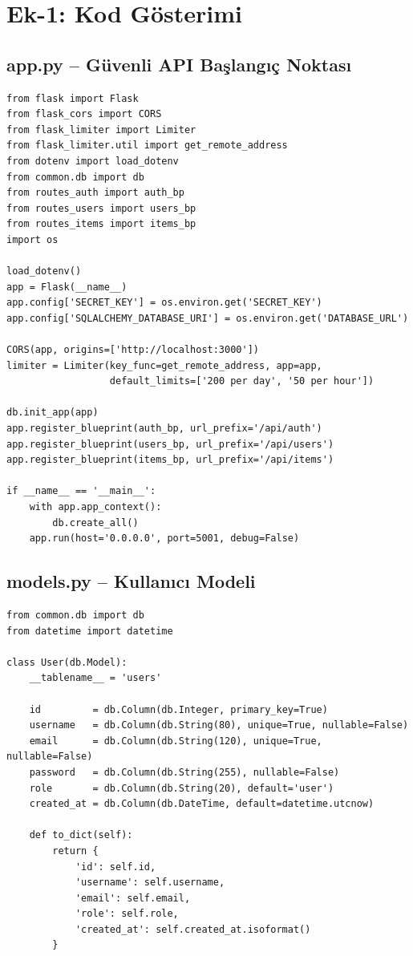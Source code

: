 \section{Ek-1: Kod Gösterimi}
\label{ek1}

\subsection{app.py -- Güvenli API Başlangıç Noktası}

\begin{lstlisting}
from flask import Flask
from flask_cors import CORS
from flask_limiter import Limiter
from flask_limiter.util import get_remote_address
from dotenv import load_dotenv
from common.db import db
from routes_auth import auth_bp
from routes_users import users_bp
from routes_items import items_bp
import os

load_dotenv()
app = Flask(__name__)
app.config['SECRET_KEY'] = os.environ.get('SECRET_KEY')
app.config['SQLALCHEMY_DATABASE_URI'] = os.environ.get('DATABASE_URL')

CORS(app, origins=['http://localhost:3000'])
limiter = Limiter(key_func=get_remote_address, app=app,
                  default_limits=['200 per day', '50 per hour'])

db.init_app(app)
app.register_blueprint(auth_bp, url_prefix='/api/auth')
app.register_blueprint(users_bp, url_prefix='/api/users')
app.register_blueprint(items_bp, url_prefix='/api/items')

if __name__ == '__main__':
    with app.app_context():
        db.create_all()
    app.run(host='0.0.0.0', port=5001, debug=False)
\end{lstlisting}

\subsection{models.py -- Kullanıcı Modeli}

\begin{lstlisting}
from common.db import db
from datetime import datetime

class User(db.Model):
    __tablename__ = 'users'

    id         = db.Column(db.Integer, primary_key=True)
    username   = db.Column(db.String(80), unique=True, nullable=False)
    email      = db.Column(db.String(120), unique=True, nullable=False)
    password   = db.Column(db.String(255), nullable=False)
    role       = db.Column(db.String(20), default='user')
    created_at = db.Column(db.DateTime, default=datetime.utcnow)

    def to_dict(self):
        return {
            'id': self.id,
            'username': self.username,
            'email': self.email,
            'role': self.role,
            'created_at': self.created_at.isoformat()
        }
\end{lstlisting}

\clearpage
